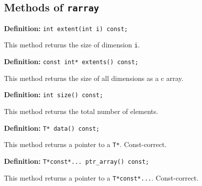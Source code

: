 \documentclass[12pt,twoside]{article}
\begin{document}
\subsection{Methods of {\tt rarray}}

\noindent\textbf{Definition:} \texttt{int extent(int i) const;}

This method returns the size of dimension \texttt{i}.

\noindent\textbf{Definition:} \texttt{const int* extents() const;}

This method returns the size of all dimensions as a c array. 

\noindent\textbf{Definition:} \texttt{int size() const;}

This method returns the total number of elements.


\noindent\textbf{Definition:} \texttt{T* data() const;}

This method returns a pointer to a \texttt{T*}. Const-correct.


\noindent\textbf{Definition:} \texttt{T*const*... ptr\_array() const;}

This method returns a pointer to a \texttt{T*const*...}. Const-correct.

\end{document}
